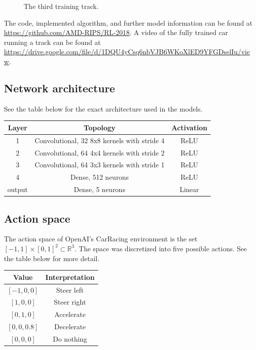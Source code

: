 \documentclass{article}
\begin{document}
\begin{figure}[!h]
\begin{minipage}[t]{.3\textwidth}
  \caption{The third training track.}
\end{minipage}
\vspace{-2.5mm}
\end{figure}

The code, implemented algorithm, and further model information can
be found at \url{https://github.com/AMD-RIPS/RL-2018}. A video of the
fully trained car running a track can be found at
\url{https://drive.google.com/file/d/1DQU4yCsq6nbVJB6WKoXlED9YFGDselIu/view}. 

\subsection{Network architecture}
See the table below for the exact architecture used in the models. 
\begin{table}[h!]
  \begin{center}
    \begin{tabular}{c|c|c}
      \textbf{Layer} & \textbf{Topology} & \textbf{Activation}\\
      \hline
      1 & Convolutional, 32 8x8 kernels with stride 4 & ReLU \\
      2 & Convolutional, 64 4x4 kernels with stride 2 & ReLU \\      
      3 & Convolutional, 64 3x3 kernels with stride 1 & ReLU \\
      4 & Dense, 512 neurons & ReLU \\
      output & Dense, 5 neurons & Linear \\
    \end{tabular}
    \vspace{0.1cm}
    \label{tab:network_architecture}
  \end{center}
\end{table}

\subsection{Action space}
The action space of OpenAI's CarRacing environment is the set $[-1,1]
\times [0,1]^2 \subset \mathbb{R}^3$. The space was discretized into
five possible actions. See the table below for more detail.  
\begin{table}[h!]
  \begin{center}
    \begin{tabular}{c|c}
      \textbf{Value} & \textbf{Interpretation} \\
      \hline
      $[-1,0,0]$ & Steer left \\
      $[1,0,0]$ & Steer right \\
      $[0,1,0]$ & Accelerate \\
      $[0,0,0.8]$ & Decelerate \\
      $[0,0,0]$ & Do nothing \\
    \end{tabular}
    \vspace{0.1cm}
    \label{tab:actions}
  \end{center}
\end{table}
\end{document}
